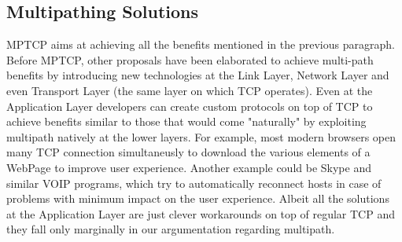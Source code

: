 \subsection{Multipathing Solutions}
\vspace{5mm}
MPTCP aims at achieving all the benefits mentioned in the previous paragraph. Before MPTCP, other proposals have been elaborated to achieve multi-path benefits by introducing new technologies at the Link Layer, Network Layer and even Transport Layer (the same layer on which TCP operates). Even at the Application Layer developers can create custom protocols on top of TCP to achieve benefits similar to those that would come "naturally" by exploiting multipath natively at the lower layers. 
For example, most modern browsers open many TCP connection simultaneusly to download the various elements of a WebPage to improve user experience. Another example could be Skype and similar VOIP programs, which try to automatically reconnect hosts in case of problems with minimum impact on the user experience. Albeit all the solutions at the Application Layer are just clever workarounds on top of regular TCP and they fall only marginally in our argumentation regarding multipath.

